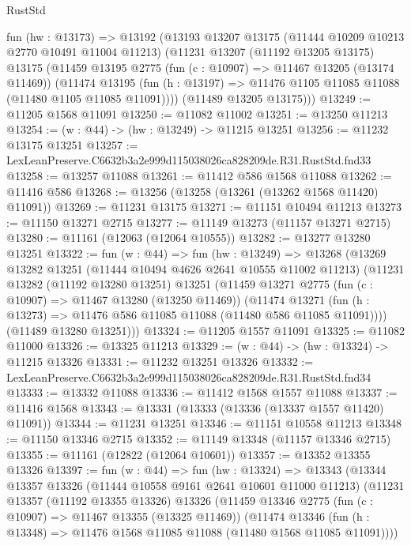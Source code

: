 \begin{lexlean}{RustStd}
\begin{coremodule}
  fun (hw : @13173) =>
  @13192
    (@13193
      @13207
      @13175
      (@11444 @10209 @10213 @2770 @10491 @11004 @11213)
      (@11231
        @13207
        (@11192 @13205 @13175)
        @13175
        (@11459
          @13195
          @2775
          (fun (c : @10907) => @11467 @13205 (@13174 @11469))
          (@11474
            @13195
            (fun (h : @13197) => @11476 @1105 @11085 @11088 (@11480 @1105 @11085 @11091))))
        (@11489 @13205 @13175)))
@13249 := @11205 @1568 @11091
@13250 := @11082 @11002
@13251 := @13250 @11213
@13254 := (w : @44) -> (hw : @13249) -> @11215 @13251
@13256 := @11232 @13175 @13251
@13257 := LexLeanPreserve.C6632b3a2e999d115038026ca828209de.R31.RustStd.fnd33
@13258 := @13257 @11088
@13261 := @11412 @586 @1568 @11088
@13262 := @11416 @586
@13268 := @13256 (@13258 (@13261 (@13262 @1568 @11420) @11091))
@13269 := @11231 @13175
@13271 := @11151 @10494 @11213
@13273 := @11150 @13271 @2715
@13277 := @11149 @13273 (@11157 @13271 @2715)
@13280 := @11161 (@12063 (@12064 @10555))
@13282 := @13277 @13280 @13251
@13322 := fun (w : @44) =>
  fun (hw : @13249) =>
  @13268
    (@13269
      @13282
      @13251
      (@11444 @10494 @4626 @2641 @10555 @11002 @11213)
      (@11231
        @13282
        (@11192 @13280 @13251)
        @13251
        (@11459
          @13271
          @2775
          (fun (c : @10907) => @11467 @13280 (@13250 @11469))
          (@11474
            @13271
            (fun (h : @13273) => @11476 @586 @11085 @11088 (@11480 @586 @11085 @11091))))
        (@11489 @13280 @13251)))
@13324 := @11205 @1557 @11091
@13325 := @11082 @11000
@13326 := @13325 @11213
@13329 := (w : @44) -> (hw : @13324) -> @11215 @13326
@13331 := @11232 @13251 @13326
@13332 := LexLeanPreserve.C6632b3a2e999d115038026ca828209de.R31.RustStd.fnd34
@13333 := @13332 @11088
@13336 := @11412 @1568 @1557 @11088
@13337 := @11416 @1568
@13343 := @13331 (@13333 (@13336 (@13337 @1557 @11420) @11091))
@13344 := @11231 @13251
@13346 := @11151 @10558 @11213
@13348 := @11150 @13346 @2715
@13352 := @11149 @13348 (@11157 @13346 @2715)
@13355 := @11161 (@12822 (@12064 @10601))
@13357 := @13352 @13355 @13326
@13397 := fun (w : @44) =>
  fun (hw : @13324) =>
  @13343
    (@13344
      @13357
      @13326
      (@11444 @10558 @9161 @2641 @10601 @11000 @11213)
      (@11231
        @13357
        (@11192 @13355 @13326)
        @13326
        (@11459
          @13346
          @2775
          (fun (c : @10907) => @11467 @13355 (@13325 @11469))
          (@11474
            @13346
            (fun (h : @13348) => @11476 @1568 @11085 @11088 (@11480 @1568 @11085 @11091))))

\end{coremodule}
\end{lexlean}

